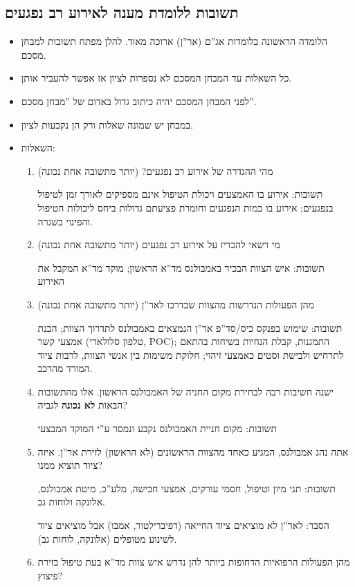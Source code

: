 \documentclass{article}
\begin{document}
\subsection{תשובות ללומדת מענה לאירוע רב נפגעים}
\begin{itemize}
\item הלומדה הראשונה בלומדות אג''ם (אר''ן) ארוכה מאוד. להלן מפתח תשובות למבחן מסכם.
\item כל השאלות עד המבחן המסכם לא נספרות לציון אז אפשר להעביר אותן.
\item לפני המבחן המסכם יהיה כיתוב גדול באדום של ''מבחן מסכם''.
\item במבחן יש שמונה שאלות ורק הן נקבעות לציון.
\item השאלות:
    \begin{enumerate}
        \item מהי ההגדרה של אירוע רב נפגעים? (יותר מתשובה אחת נכונה)

            תשובות: אירוע בו האמצעים ויכולת הטיפול אינם מספיקים לאורך זמן לטיפול בנפגעים; אירוע בו כמות הנפגעים וחומרת פציעתם גדולות ביחס ליכולות הטיפול והפינוי בשגרה.
        \item מי רשאי להכריז על אירוע רב נפגעים (יותר מתשובה אחת נכונה)

            תשובות: איש הצוות הבכיר באמבולנס מד''א הראשון; מוקד מד''א המקבל את האירוע
        \item מהן הפעולות הנדרשות מהצוות שבדרכו לאר''ן (יותר מתשובה אחת נכונה)

            תשובות: שימוש בפנקס כיס/סד''פ אר''ן הנמצאים באמבולנס לתדרוך הצוות; הכנת אמצעי קשר (טלפון סלולארי, POC); התמגנות, קבלת הנחיות בשיחות בהתאם לתרחיש ולבישת וסטים כאמצעי זיהוי; חלוקת משימות בין אנשי הצוות, לרבות ציוד המורד מהרכב.
        \item ישנה חשיבות רבה לבחירת מקום החניה של האמבולנס הראשון. אלו מהתשובות הבאות \textbf{לא נכונה} לגביה?

            תשובות: מקום חניית האמבולנס נקבע ונמסר ע''י המוקד המבצעי

       \item אתה נהג אמבולנס, המגיע כאחד מהצוות הראשונים (לא הראשון) לזירת אר''ן. איזה ציוד תוציא ממנו?

            תשובות: תגי מיון וטיפול, חסמי עורקים, אמצעי חבישה, מלע''כ, מיטת אמבולנס, אלונקה ולוחות גב.

            הסבר: לאר''ן לא מוציאים ציוד החייאה (דפיברילטור, אמבו) אבל מוציאים ציוד לשינוע מטופלים (אלונקה, לוחות גב).
        \item מהן הפעולות הרפואיות הדחופות ביותר להן נדרש איש צוות מד''א בעת טיפול בזירת פיצוץ?


\end{enumerate}
\end{itemize}
\end{document}
